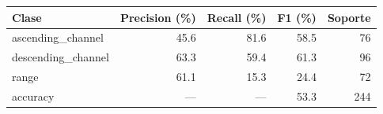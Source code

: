 \begin{tabular}{lrrrr}
\toprule
             Clase & Precision (\%) & Recall (\%) & F1 (\%) & Soporte \\
\midrule
 ascending\_channel &          45.6 &       81.6 &   58.5 &      76 \\
descending\_channel &          63.3 &       59.4 &   61.3 &      96 \\
             range &          61.1 &       15.3 &   24.4 &      72 \\
          accuracy &             — &          — &   53.3 &     244 \\
\bottomrule
\end{tabular}
